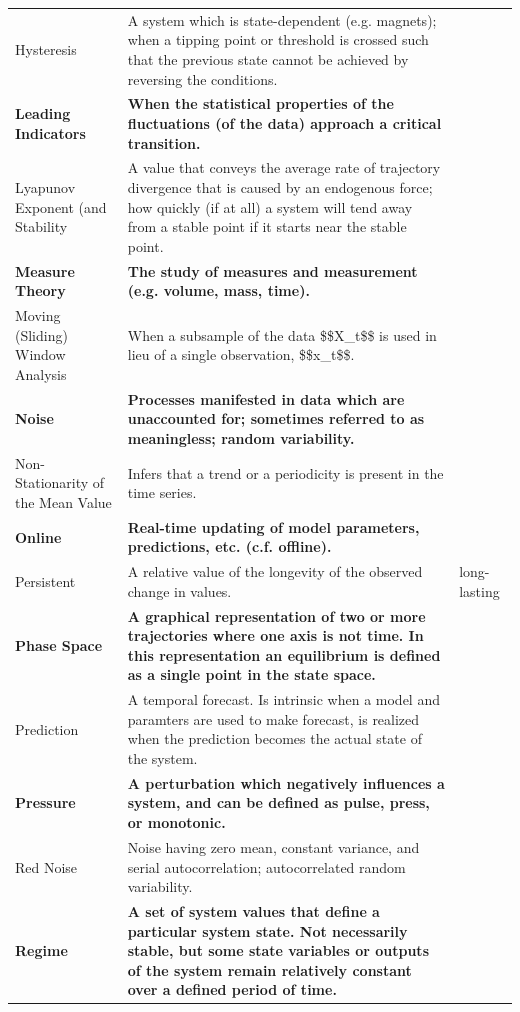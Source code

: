 \documentclass[12pt,twoside,openany]{reedthesis}
\begin{document}
\begin{longtable}{>{\raggedright\arraybackslash}p{8em}>{\raggedright\arraybackslash}p{25em}>{\raggedright\arraybackslash}p{6em}}
Hysteresis & A system which is state-dependent (e.g. magnets); when a tipping point or threshold is crossed such that the previous state cannot be achieved by reversing the conditions. & \\
\textbf{Leading Indicators} & \textbf{When the statistical properties of the fluctuations (of the data) approach a critical transition.} & \textbf{}\\
Lyapunov Exponent (and Stability & A value that conveys the average rate of trajectory divergence that is caused by an endogenous force; how quickly (if at all) a system will tend away from a stable point if it starts near the stable point. & \\
\addlinespace
\textbf{Measure Theory} & \textbf{The study of measures and measurement (e.g. volume, mass, time).} & \textbf{}\\
Moving (Sliding) Window Analysis & When a subsample of the data \$\$X\_t\$\$ is used in lieu of a single observation, \$\$x\_t\$\$. & \\
\textbf{Noise} & \textbf{Processes manifested in data which are unaccounted for; sometimes referred to as meaningless; random variability.} & \textbf{}\\
Non-Stationarity of the Mean Value & Infers that a trend or a periodicity is present in the time series. & \\
\textbf{Online} & \textbf{Real-time updating of model parameters, predictions, etc. (c.f. offline).} & \textbf{}\\
\addlinespace
Persistent & A relative value of the longevity of the observed change in values. & long-lasting\\
\textbf{Phase Space} & \textbf{A graphical representation of two or more trajectories where one axis is not time. In this representation an equilibrium is defined as a single point in the state space.} & \textbf{}\\
Prediction & A temporal forecast. Is intrinsic when a model and paramters are used to make forecast, is realized when the prediction becomes the actual state of the system. & \\
\textbf{Pressure} & \textbf{A perturbation which negatively influences a system, and can be defined as pulse, press, or monotonic.} & \textbf{}\\
Red Noise & Noise having zero mean, constant variance, and serial autocorrelation; autocorrelated random variability. & \\
\addlinespace
\textbf{Regime} & \textbf{A set of system values that define a particular system state. Not necessarily stable, but some state variables or outputs of the system remain relatively constant over a defined period of time.} & \textbf{}\\

\end{longtable}
\end{document}
